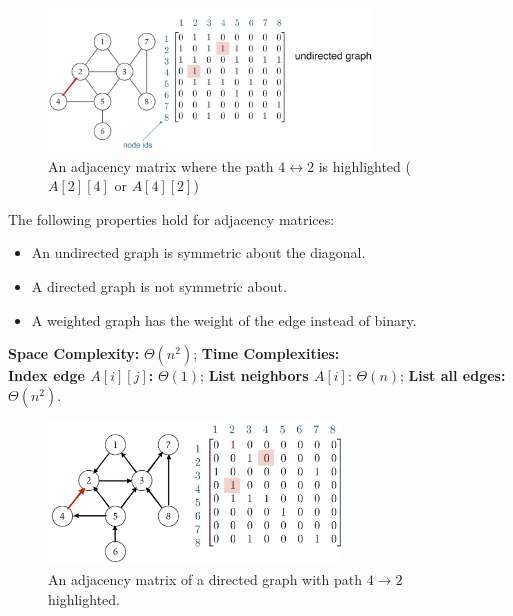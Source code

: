   
\begin{figure}[h]
  \begin{center}
    \includegraphics[height=1.5in]{./Sections/graphs/adj_matrix.png}
  \end{center}
   \caption{An adjacency matrix where the path $4\leftrightarrow2$ is highlighted ($A[2][4]$ or $A[4][2]$)}\label{fig:adj_matrix}
\end{figure}
\begin{theo}

  The following properties hold for adjacency matrices:
    \begin{itemize}
        \item An undirected graph is symmetric about the diagonal.
        \item A directed graph is not symmetric about.
        \item A weighted graph has the weight of the edge instead of binary.
    \end{itemize}
    \noindent
    \textbf{Space Complexity:} $\Theta (n^2)$; \textbf{Time Complexities:}\\
    \textbf{Index edge $A[i][j]$:} $\Theta (1)$; \textbf{List neighbors $A[i]$}: $\Theta(n)$; \textbf{List all edges:} $\Theta(n^2)$.
\end{theo}

\begin{figure}[h]
  \begin{center}
    \includegraphics[height=1.5in]{./Sections/graphs/adj_matrix_dir.png}
  \end{center}
   \caption{An adjacency matrix of a directed graph with path $4\rightarrow2$ highlighted.}\label{fig:adj_matri_dir}
\end{figure}

